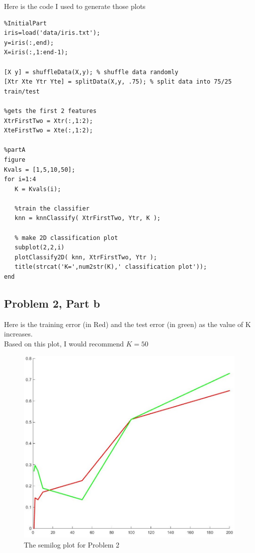 \documentclass[11pt,psfig]{article}
\begin{document}
\newpage

Here is the code I used to generate those plots

\begin{verbatim}
%InitialPart
iris=load('data/iris.txt'); 
y=iris(:,end); 
X=iris(:,1:end-1);

[X y] = shuffleData(X,y); % shuffle data randomly
[Xtr Xte Ytr Yte] = splitData(X,y, .75); % split data into 75/25 train/test

%gets the first 2 features
XtrFirstTwo = Xtr(:,1:2);
XteFirstTwo = Xte(:,1:2);

%partA
figure
Kvals = [1,5,10,50];
for i=1:4
   K = Kvals(i);
   
   %train the classifier
   knn = knnClassify( XtrFirstTwo, Ytr, K );
   
   % make 2D classification plot
   subplot(2,2,i)
   plotClassify2D( knn, XtrFirstTwo, Ytr );
   title(strcat('K=',num2str(K),' classification plot'));
end
\end{verbatim}

\newpage

\subsection*{Problem 2, Part b}

Here is the training error (in Red) and the test error (in green) as the value of K increases. \\
Based on this plot, I would recommend $K=50$

\begin{figure}[H]
\centering
\includegraphics[width=\columnwidth]{prob2bPlot.jpg}
\caption{The semilog plot for Problem 2}
\end{figure}
\end{document}
